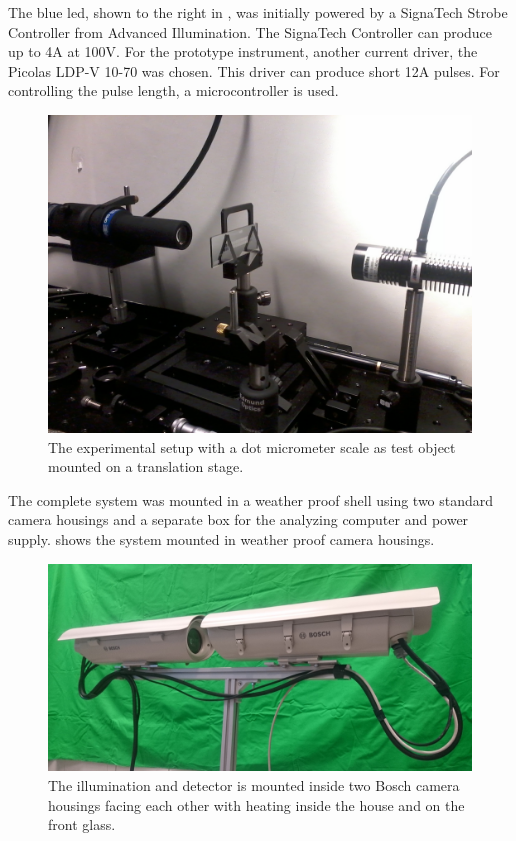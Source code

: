 The blue \gls{led}, shown to the right in , was initially powered by a SignaTech Strobe Controller from Advanced Illumination. The SignaTech Controller can produce up to 4A at 100V. For the prototype instrument, another current driver, the Picolas LDP-V 10-70 was chosen. This driver can produce short 12A pulses. For controlling the pulse length, a microcontroller is used. 

\begin{figure}[ht]
\centering\includegraphics[width=0.75\linewidth]{figures/Foto0169}
\caption{The experimental setup with a dot micrometer scale as test object mounted on a translation stage.}
\label{fig:experimental}
\end{figure}

The complete system was mounted in a weather proof shell using two standard camera housings and a separate box for the analyzing computer and power supply.  shows the system mounted in weather proof camera housings. 

\begin{figure}[ht]
\centering\includegraphics[width=0.75\linewidth]{figures/cam_housings}
\caption{The illumination and detector is mounted inside two Bosch camera housings facing each other with heating inside the house and on the front glass.}
\label{fig:housings}
\end{figure}

